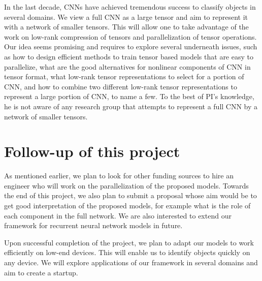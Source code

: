 \documentclass[11pt]{article}
\begin{document}
In the last decade,  CNNs have achieved tremendous success to classify objects in several domains. We view a full CNN as a large tensor and aim to represent it with a network of smaller tensors. This will allow one to take advantage of the work on low-rank compression of tensors and parallelization of tensor operations.  Our idea seems promising and requires to explore several underneath issues, such as how to design efficient methods to train tensor based models that are easy to parallelize, what are the  good alternatives for nonlinear components of CNN in tensor format, what low-rank tensor representations to select for a portion of CNN, and how to combine  two different low-rank tensor representations  to represent a large portion of CNN, to name a few. To the best of PI's knowledge, he is not aware of any research group that attempts to represent a full CNN by a network of smaller tensors.


\section{Follow-up of this project}
As mentioned earlier, we plan to look for other funding sources to hire an engineer who will work on the parallelization of the proposed models. Towards the end of this project, we also plan to submit a proposal whose aim would be to get good interpretation of the proposed models, for example what is the role of each component in the full network. We are also interested to extend our framework for recurrent neural network models in future. 

Upon successful completion of the project, we plan to adapt our models to work efficiently on low-end devices. This will enable us to  identify objects quickly on any device. We will explore applications of our framework in several domains and aim to create a startup.

{\footnotesize


}
\end{document}
